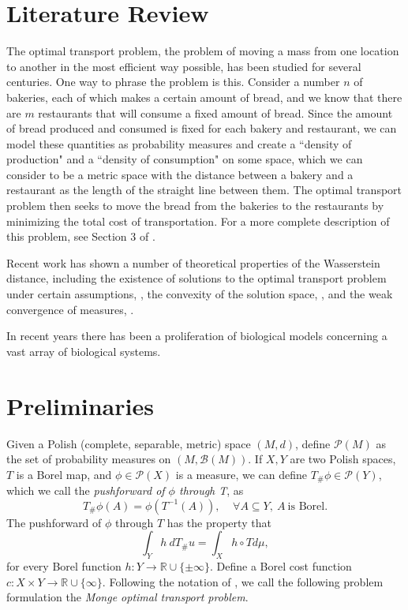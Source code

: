 \documentclass[10pt]{article}
\begin{document}
\section{Literature Review} 
The optimal transport problem, the problem of moving a mass from one location to another in the most efficient way possible, has been studied for several centuries. One way to phrase the problem is this. Consider a number $n$ of bakeries, each of which makes a certain amount of bread, and we know that there are $m$ restaurants that will consume a fixed amount of bread. Since the amount of bread produced and consumed is fixed for each bakery and restaurant, we can model these quantities as probability measures and create a ``density of production" and a ``density of consumption" on some space, which we can consider to be a metric space with the distance between a bakery and a restaurant as the length of the straight line between them. The optimal transport problem then seeks to move the bread from the bakeries to the restaurants by minimizing the total cost of transportation. For a more complete description of this problem, see Section 3 of \cite{CVillani}.

\noindent Recent work has shown a number of theoretical properties of the Wasserstein distance, including the existence of solutions to the optimal transport problem under certain assumptions, \cite{CVillani}, the convexity of the solution space, \cite{AN}, and the weak convergence of measures, \cite{AN}. 

\noindent In recent years there has been a proliferation of biological models concerning a vast array of biological systems. 

\section{Preliminaries}
\label{sec: Preliminaries}
Given a Polish (complete, separable, metric) space $(M,d)$, define $\mathcal{P}(M)$ as the set of probability measures on $(M, \mathcal{B}(M))$. If $X, Y$ are two Polish spaces, $T$ is a Borel map, and $\phi \in \mathcal{P}(X)$ is a measure, we can define $T_{\#}\phi \in \mathcal{P}(Y)$, which we call the \textit{pushforward of $\phi$ through T}, as 
\begin{equation}
T_{\#}\phi(A) = \phi(T^{-1}(A)), \ \ \ \ \ \forall A \subseteq Y, \  A \  \text{is Borel}.
\label{eq: TransportDefn}
\end{equation}
The pushforward of $\phi$ through $T$ has the property that
\begin{equation}
\int_Y h \ dT_{\#}u = \int_X h \circ T d\mu,
\label{eq: TransportProperty}
\end{equation}
for every Borel function $h: Y \rightarrow \mathbb{R} \cup \{\pm \infty\}$. Define a Borel cost function $c: X \times Y \rightarrow \mathbb{R} \cup \{\infty\}$. Following the notation of \cite{AN}, we call the following problem formulation the \textit{Monge optimal transport problem}.
\end{document}
